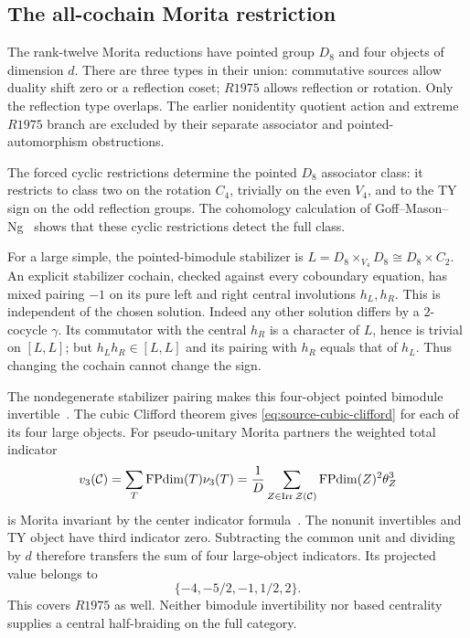 \subsection{The all-cochain Morita restriction}
The rank-twelve Morita reductions have pointed group $D_8$ and four
objects of dimension $d$. There are three types in their union:
commutative sources allow duality shift zero or a reflection coset;
$R1975$ allows reflection or rotation. Only the reflection type overlaps.
The earlier nonidentity quotient action and extreme $R1975$ branch
are excluded by their separate associator and pointed-automorphism
obstructions.

The forced cyclic restrictions determine the pointed $D_8$ associator
class: it restricts to class two on the rotation $C_4$, trivially on
the even $V_4$, and to the TY sign on the odd reflection groups.
The cohomology calculation of Goff--Mason--Ng~\cite[Lemmas 4.4--4.5]{RetryGMN}
shows that these cyclic restrictions detect the full class.

For a large simple, the pointed-bimodule stabilizer is
$L=D_8\times_{V_4}D_8\cong D_8\times C_2$. An explicit stabilizer
cochain, checked against every coboundary equation, has mixed pairing
$-1$ on its pure left and right central involutions $h_L,h_R$.
This is independent of the chosen solution. Indeed any other solution
differs by a $2$-cocycle $\gamma$. Its commutator with the central
$h_R$ is a character of $L$, hence is trivial on $[L,L]$; but
$h_Lh_R\in[L,L]$ and its pairing with $h_R$ equals that of $h_L$.
Thus changing the cochain cannot change the sign.

The nondegenerate stabilizer pairing makes this four-object pointed
bimodule invertible~\cite[Proposition 2.7]{RetryVV}. The cubic Clifford theorem gives
\eqref{eq:source-cubic-clifford} for each of its four large objects.
For pseudo-unitary Morita partners the weighted total indicator
\[
 v_3(\mathcal C)=\sum_T\operatorname{FPdim}(T)\nu_3(T)
 =\frac1D\sum_{Z\in\operatorname{Irr}\mathcal Z(\mathcal C)}
                 \operatorname{FPdim}(Z)^2\theta_Z^3
\]
is Morita invariant by the center indicator formula~\cite{RetryNS}. The nonunit invertibles and TY object have third
indicator zero. Subtracting the common unit and dividing by $d$
therefore transfers the sum of four large-object indicators. Its
projected value belongs to
\[
 \{-4,-5/2,-1,1/2,2\}.
\]
This covers $R1975$ as well. Neither bimodule invertibility nor
based centrality supplies a central half-braiding on the full category.

